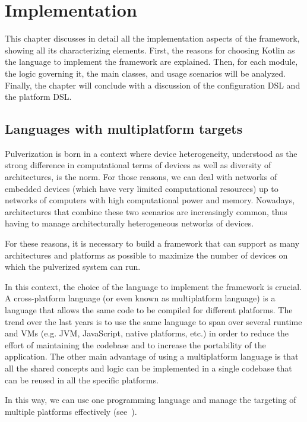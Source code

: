 \chapter{Implementation}
\label{chap:implementation}

This chapter discusses in detail all the implementation aspects of the framework, showing all its characterizing elements.
First, the reasons for choosing Kotlin as the language to implement the framework are explained.
Then, for each module, the logic governing it, the main classes, and usage scenarios will be analyzed.
Finally, the chapter will conclude with a discussion of the configuration DSL and the platform DSL.

\section{Languages with multiplatform targets}
\label{sec:languages-multiplatform-targets}

Pulverization is born in a context where device heterogeneity, understood as the strong difference in computational terms of devices as well as
diversity of architectures, is the norm.
For those reasons, we can deal with networks of embedded devices (which have very limited computational resources) up to networks of computers with
high computational power and memory.
Nowadays, architectures that combine these two scenarios are increasingly common, thus having to manage architecturally heterogeneous networks of
devices.

For these reasons, it is necessary to build a framework that can support as many architectures and platforms as possible to maximize the number
of devices on which the pulverized system can run.

In this context, the choice of the language to implement the framework is crucial.
A cross-platform language (or even known as multiplatform language) is a language that allows the same code to be compiled for different platforms.
The trend over the last years is to use the same language to span over several runtime and VMs (e.g. JVM, JavaScript, native platforms, etc.) in order
to reduce the effort of maintaining the codebase and to increase the portability of the application.
The other main advantage of using a multiplatform language is that all the shared concepts and logic can be implemented in a single codebase that
can be reused in all the specific platforms.

In this way, we can use one programming language and manage the targeting of multiple platforms effectively (see~).

